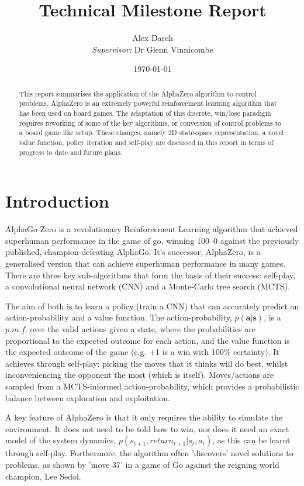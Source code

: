 \documentclass[11.7pt]{article}
\author{Alex Darch \\
   \textit{Supervisor:} Dr Glenn Vinnicombe}
\title{Technical Milestone Report}
\date{\today}
\begin{document}
%

\maketitle

\renewcommand{\abstractname}{Summary}
\begin{abstract}
   This report summarises the application of the AlphaZero algorithm to control problems. AlphaZero is an extremely powerful reinforcement learning algorithm that has been used on board games. The adaptation of this discrete, win/lose paradigm requires reworking of some of the key algorithms, or conversion of control problems to a board game like setup. These changes, namely 2D state-space representation, a novel value function, policy iteration and self-play are discussed in this report in terms of progress to date and future plans.
\end{abstract}

\section{Introduction}

AlphaGo Zero is a revolutionary Reinforcement Learning algorithm that achieved superhuman performance in the game of go, winning 100–0 against the previously published, champion-defeating AlphaGo. It's successor, AlphaZero, is a generalised version that can achieve superhuman performance in many games. There are three key sub-algorithms that form the basis of their success: self-play, a convolutional neural network (CNN) and a Monte-Carlo tree search (MCTS). 

The aim of both is to learn a policy (train a CNN) that can accurately predict an action-probability and a value function. The action-probability, $p(\boldsymbol{a}|\boldsymbol{s})$, is a $p.m.f.$ over the valid actions given a state, where the probabilities are proportional to the expected outcome for each action, and the value function is the expected outcome of the game (e.g. +1 is a win with 100\% certainty). It achieves through self-play: picking the moves that it thinks will do best, whilst inconveniencing the opponent the most (which is itself). Moves/actions are sampled from a MCTS-informed action-probability, which provides a probabilistic balance between exploration and exploitation. 

A key feature of AlphaZero is that it only requires the ability to simulate the environment. It does not need to be told how to win, nor does it need an exact model of the system dynamics, $p(s_{t+1}, return_{t+1} |s_t, a_t)$, as this can be learnt through self-play. Furthermore, the algorithm often 'discovers' novel solutions to problems, as shown by 'move 37' in a game of Go against the reigning world champion, Lee Sedol.
\end{document}
